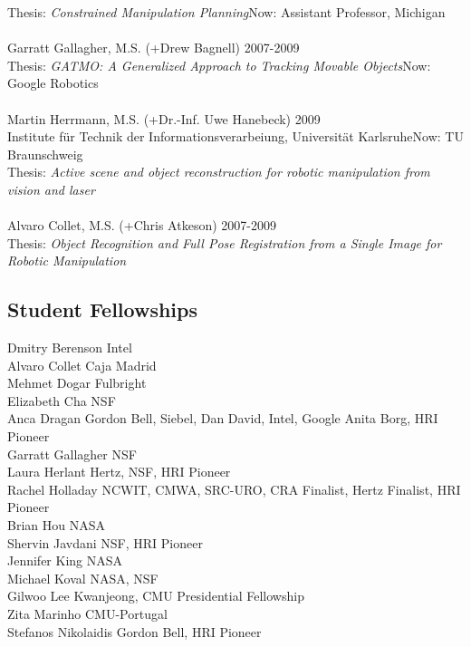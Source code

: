 Thesis: \textit{Constrained Manipulation Planning}\hfill Now: Assistant Professor, Michigan\\
\\
Garratt Gallagher, M.S. (+Drew Bagnell) \hfill 2007-2009\\ 
Thesis: \textit{GATMO: A Generalized Approach to Tracking Movable Objects}\hfill Now: Google Robotics\\
\\
Martin Herrmann, M.S. (+Dr.-Inf. Uwe Hanebeck) \hfill 2009\\
Institute f\"ur Technik der Informationsverarbeiung, Universit\"at Karlsruhe\hfill Now: TU Braunschweig\\
Thesis: \textit{Active scene and object reconstruction for robotic manipulation from vision and laser}\\
\\
Alvaro Collet, M.S. (+Chris Atkeson) \hfill 2007-2009\\
Thesis: \textit{Object Recognition and Full Pose Registration from a Single Image for Robotic Manipulation}\\

\subsection{Student Fellowships}
\noindent
Dmitry Berenson \hfill Intel\\
Alvaro Collet \hfill Caja Madrid\\
Mehmet Dogar \hfill Fulbright\\
Elizabeth Cha \hfill NSF\\
Anca Dragan \hfill Gordon Bell, Siebel, Dan David, Intel, Google Anita Borg, HRI Pioneer\\
Garratt Gallagher \hfill NSF\\
Laura Herlant \hfill Hertz, NSF, HRI Pioneer\\
Rachel Holladay \hfill NCWIT, CMWA, SRC-URO, CRA Finalist, Hertz Finalist, HRI Pioneer\\
Brian Hou \hfill NASA\\
Shervin Javdani \hfill NSF, HRI Pioneer\\
Jennifer King \hfill NASA\\
Michael Koval \hfill NASA, NSF\\
Gilwoo Lee \hfill Kwanjeong, CMU Presidential Fellowship \\
Zita Marinho \hfill CMU-Portugal\\
Stefanos Nikolaidis \hfill Gordon Bell, HRI Pioneer\\



